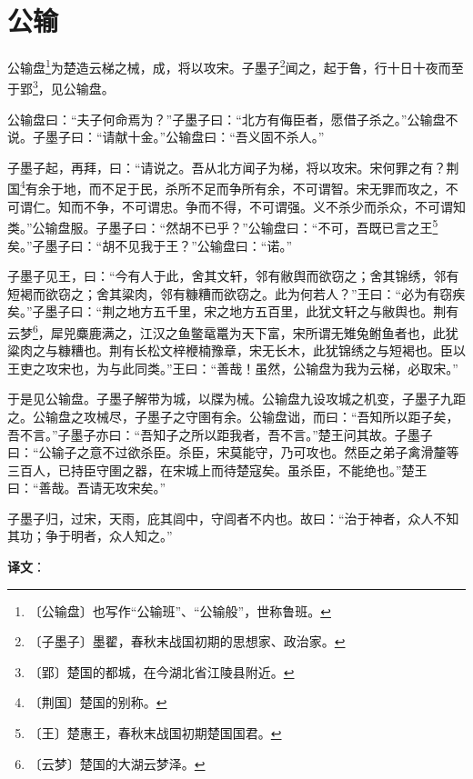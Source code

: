 \documentclass[12pt,UTF-8,openany,a4]{ctexbook}
\begin{document}
\chapter{公输}

\begin{large}
    
    公输盘\footnote{〔公输盘〕\yiwen 也写作“公输班”、“公输般”，世称鲁班。}为楚造云梯之械，成，将以攻宋。子墨子\footnote{〔子墨子〕\yiwen 墨翟，春秋末战国初期的思想家、政治家。}闻之，起于鲁，行十日十夜而至于郢\footnote{〔郢〕\yiwen 楚国的都城，在今湖北省江陵县附近。}，见公输盘。
    
    公输盘曰：“夫子何命焉为？”子墨子曰：“北方有侮臣者，愿借子杀之。”公输盘不说。子墨子曰：“请献十金。”公输盘曰：“吾义固不杀人。”
    
    子墨子起，再拜，曰：“请说之。吾从北方闻子为梯，将以攻宋。宋何罪之有？荆国\footnote{〔荆国〕\yiwen 楚国的别称。}有余于地，而不足于民，杀所不足而争所有余，不可谓智。宋无罪而攻之，不可谓仁。知而不争，不可谓忠。争而不得，不可谓强。义不杀少而杀众，不可谓知类。”公输盘服。子墨子曰：“然胡不已乎？”公输盘曰：“不可，吾既已言之王\footnote{〔王〕\yiwen 楚惠王，春秋末战国初期楚国国君。}矣。”子墨子曰：“胡不见我于王？”公输盘曰：“诺。”
    
    子墨子见王，曰：“今有人于此，舍其文轩，邻有敝舆而欲窃之；舍其锦绣，邻有短褐而欲窃之；舍其粱肉，邻有糠糟而欲窃之。此为何若人？”王曰：“必为有窃疾矣。”子墨子曰：“荆之地方五千里，宋之地方五百里，此犹文轩之与敝舆也。荆有云梦\footnote{〔云梦〕\yiwen 楚国的大湖云梦泽。}，犀兕麋鹿满之，江汉之鱼鳖鼋鼍为天下富，宋所谓无雉兔鲋鱼者也，此犹粱肉之与糠糟也。荆有长松文梓楩楠豫章，宋无长木，此犹锦绣之与短褐也。臣以王吏之攻宋也，为与此同类。”王曰：“善哉！虽然，公输盘为我为云梯，必取宋。”
    
    于是见公输盘。子墨子解带为城，以牒为械。公输盘九设攻城之机变，子墨子九距之。公输盘之攻械尽，子墨子之守圉有余。公输盘诎，而曰：“吾知所以距子矣，吾不言。”子墨子亦曰：“吾知子之所以距我者，吾不言。”楚王问其故。子墨子曰：“公输子之意不过欲杀臣。杀臣，宋莫能守，乃可攻也。然臣之弟子禽滑釐等三百人，已持臣守圉之器，在宋城上而待楚寇矣。虽杀臣，不能绝也。”楚王曰：“善哉。吾请无攻宋矣。”
    
    子墨子归，过宋，天雨，庇其闾中，守闾者不内也。故曰：“治于神者，众人不知其功；争于明者，众人知之。”

\end{large}


\newpage

\begin{Large}
   \noindent \textbf{译文}：
\end{Large}
\end{document}
